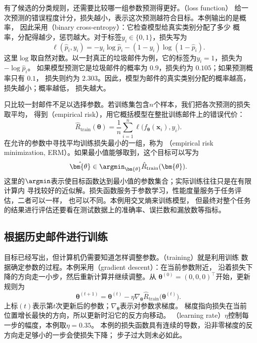 有了候选的分类规则，还需要比较哪一组参数预测得更好。（loss function）
给一次预测的错误程度计分，损失越小，表示这次预测越符合目标。本例输出的是概率，
因此采用（binary cross-entropy）：它检查模型给真实类别分配了多少
概率，分配得越少，惩罚越大。对于标签$y_i\in\{0,1\}$，损失写为
\begin{equation}
  \ell(\hat{p}_i,y_i)
  =-y_i\log\hat{p}_i-(1-y_i)\log(1-\hat{p}_i).
  \label{eq:binary-cross-entropy}
\end{equation}
这里$\log$取自然对数。以一封真正的垃圾邮件为例，它的标签为$y_i=1$，损失为$-\log\hat{p}_i$。
如果模型预测它是垃圾邮件的概率为 $0.9$，损失约为 $0.105$；如果预测概率只有 $0.1$，
损失则约为 $2.303$。因此，模型为邮件的真实类别分配的概率越高，损失越小；概率越低，
损失越大。

只比较一封邮件不足以选择参数。若训练集包含$n$个样本，我们把各次预测的损失取平均，
得到（empirical risk），用它概括模型在整批训练邮件上的错误代价：
\begin{equation}
  \hat{R}_{\mathrm{train}}(\bm{\theta})
  =\frac{1}{n}\sum_{i=1}^{n}\ell\bigl(f_{\bm{\theta}}(\bm{x}_i),y_i\bigr).
  \label{eq:spam-empirical-risk}
\end{equation}
在允许的参数中寻找平均训练损失最小的一组，称为
（empirical risk minimization, ERM）。如果最小值能够取到，这个目标可以写为
\begin{equation}
  \hat{\bm{\theta}}
  \in\argmin_{\bm{\theta}}\hat{R}_{\mathrm{train}}(\bm{\theta}).
  \label{eq:spam-erm}
\end{equation}
这里的$\argmin$表示使目标函数达到最小值的参数集合；实际训练往往只是在有限计算内
寻找较好的近似解。损失函数服务于参数学习，性能度量服务于任务评估，二者可以一样，
也可以不同。本例用交叉熵来训练模型，
但最终对整个任务的结果进行评估还要看在测试数据上的准确率、误拦数和漏放数等指标。

\subsection{根据历史邮件进行训练}

目标已经写出，但计算机仍需要知道怎样调整参数。（training）就是利用训练
数据确定参数的过程。本例采用（gradient descent）：在当前参数附近，
沿着损失下降的方向走一小步，然后重新计算并继续调整。从
$\bm{\theta}^{(0)}=(0,0,0)^{\top}$开始，更新规则为
\begin{equation}
  \bm{\theta}^{(t+1)}
  =\bm{\theta}^{(t)}-\eta\nabla_{\bm{\theta}}
  \hat{R}_{\mathrm{train}}\bigl(\bm{\theta}^{(t)}\bigr).
  \label{eq:spam-gradient-update}
\end{equation}
上标$(t)$表示第$t$次更新后的参数；$\nabla_{\bm{\theta}}$表示对参数求梯度。
梯度指向损失在当前位置增长最快的方向，所以更新时沿它的反方向移动。
（learning rate）$\eta$控制每一步的幅度，本例取$\eta=0.35$。
本例的损失函数具有连续的导数，沿非零梯度的反方向走足够小的一步会使损失下降；
步子过大则未必如此。

